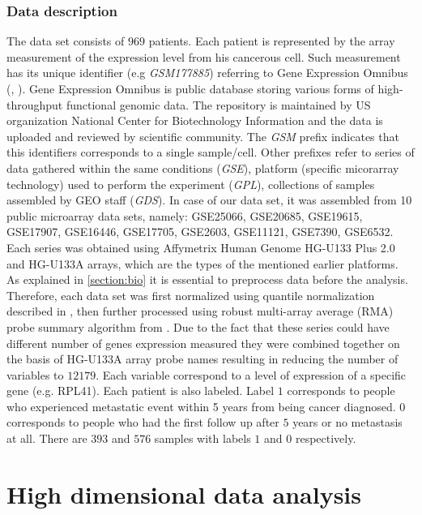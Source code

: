 \documentclass[shortabstract, english, mgr]{iithesis}
\begin{document}
\subsection{Data description}

The data set consists of $969$ patients. Each patient is represented by the array measurement of the expression level from his cancerous cell. Such measurement has its unique identifier (e.g \textit{GSM177885}) referring to Gene Expression Omnibus (\cite{GEO}, \cite{NCBI2}). Gene Expression Omnibus is public database storing various forms of high-throughput functional genomic data. The repository is maintained by US organization National Center for Biotechnology Information and the data is uploaded and reviewed by scientific community. The \textit{GSM} prefix indicates that this identifiers corresponds to a single sample/cell. Other prefixes refer to series of data gathered within the same conditions (\textit{GSE}), platform (specific micorarray technology) used to perform the experiment (\textit{GPL}), collections of samples assembled by GEO staff (\textit{GDS}). In case of our data set, it was assembled from 10 public microarray data sets, namely: GSE25066, GSE20685, GSE19615, GSE17907, GSE16446, GSE17705, GSE2603, GSE11121, GSE7390, GSE6532. Each series was obtained using Affymetrix Human Genome HG-U133 Plus 2.0 and HG-U133A arrays, which are the types of the mentioned earlier platforms. As explained in \ref{section:bio} it is essential to preprocess data before the analysis. Therefore, each data set was first normalized using quantile normalization described in \cite{quantileNorm}, then further processed using robust multi-array average (RMA) probe summary algorithm from \cite{preprocessing}. Due to the fact that these series could have different number of genes expression measured they were combined together on the basis of HG-U133A array probe names resulting in reducing the number of variables to $12179$. Each variable correspond to a level of expression of a specific gene (e.g. RPL41). Each patient is also labeled. Label $1$ corresponds to people who experienced metastatic event within 5 years from being cancer diagnosed. $0$ corresponds to people who had the first follow up after $5$ years or no metastasis at all. There are $393$ and $576$ samples with labels $1$ and $0$ respectively.

\chapter{High dimensional data analysis} \label{section:methods}
\end{document}
